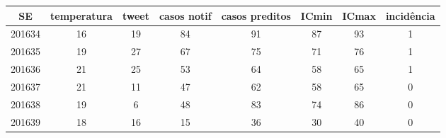 \begin{tabular}{c|ccccccc}
  \hline
SE & temperatura & tweet & casos notif & casos preditos & ICmin & ICmax & incidência \\ 
  \hline
201634 & 16 & 19 & 84 & 91 & 87 & 93 & 1 \\ 
  201635 & 19 & 27 & 67 & 75 & 71 & 76 & 1 \\ 
  201636 & 21 & 25 & 53 & 64 & 58 & 65 & 1 \\ 
  201637 & 21 & 11 & 47 & 62 & 58 & 65 & 0 \\ 
  201638 & 19 & 6 & 48 & 83 & 74 & 86 & 0 \\ 
  201639 & 18 & 16 & 15 & 36 & 30 & 40 & 0 \\ 
   \hline
\end{tabular}
